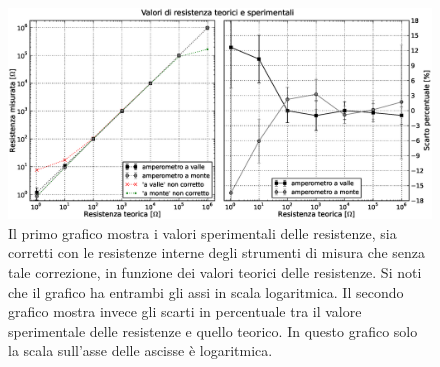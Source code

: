 \begin{figure}[h]
    \centering
        \includegraphics[width=\textwidth]{Res.eps}%
        \caption{Il primo grafico mostra i valori sperimentali delle resistenze, sia corretti con le resistenze interne degli strumenti di misura che senza tale correzione, in funzione dei valori teorici delle resistenze. Si noti che il grafico ha entrambi gli assi in scala logaritmica. Il secondo grafico mostra invece gli scarti in percentuale tra il valore sperimentale delle resistenze e quello teorico. In questo grafico solo la scala sull'asse delle ascisse è logaritmica.}
        \label{fig:resistenze}
\end{figure}

